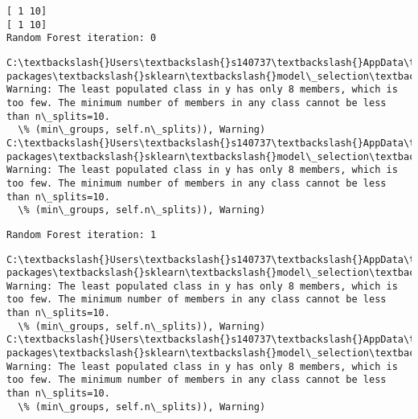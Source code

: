 \documentclass[11pt]{article}
\begin{document}
    \begin{Verbatim}[commandchars=\\\{\}]
[ 1 10]
[ 1 10]
Random Forest iteration: 0 

    \end{Verbatim}

    \begin{Verbatim}[commandchars=\\\{\}]
C:\textbackslash{}Users\textbackslash{}s140737\textbackslash{}AppData\textbackslash{}Local\textbackslash{}Continuum\textbackslash{}anaconda3\textbackslash{}lib\textbackslash{}site-packages\textbackslash{}sklearn\textbackslash{}model\_selection\textbackslash{}\_split.py:605: Warning: The least populated class in y has only 8 members, which is too few. The minimum number of members in any class cannot be less than n\_splits=10.
  \% (min\_groups, self.n\_splits)), Warning)
C:\textbackslash{}Users\textbackslash{}s140737\textbackslash{}AppData\textbackslash{}Local\textbackslash{}Continuum\textbackslash{}anaconda3\textbackslash{}lib\textbackslash{}site-packages\textbackslash{}sklearn\textbackslash{}model\_selection\textbackslash{}\_split.py:605: Warning: The least populated class in y has only 8 members, which is too few. The minimum number of members in any class cannot be less than n\_splits=10.
  \% (min\_groups, self.n\_splits)), Warning)

    \end{Verbatim}

    \begin{Verbatim}[commandchars=\\\{\}]
Random Forest iteration: 1 

    \end{Verbatim}

    \begin{Verbatim}[commandchars=\\\{\}]
C:\textbackslash{}Users\textbackslash{}s140737\textbackslash{}AppData\textbackslash{}Local\textbackslash{}Continuum\textbackslash{}anaconda3\textbackslash{}lib\textbackslash{}site-packages\textbackslash{}sklearn\textbackslash{}model\_selection\textbackslash{}\_split.py:605: Warning: The least populated class in y has only 8 members, which is too few. The minimum number of members in any class cannot be less than n\_splits=10.
  \% (min\_groups, self.n\_splits)), Warning)
C:\textbackslash{}Users\textbackslash{}s140737\textbackslash{}AppData\textbackslash{}Local\textbackslash{}Continuum\textbackslash{}anaconda3\textbackslash{}lib\textbackslash{}site-packages\textbackslash{}sklearn\textbackslash{}model\_selection\textbackslash{}\_split.py:605: Warning: The least populated class in y has only 8 members, which is too few. The minimum number of members in any class cannot be less than n\_splits=10.
  \% (min\_groups, self.n\_splits)), Warning)

    \end{Verbatim}
\end{document}

